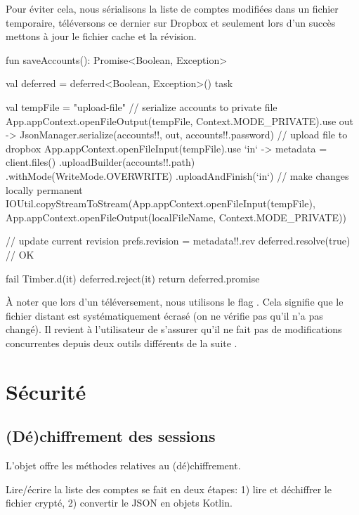 Pour éviter cela, nous sérialisons la liste de comptes modifiées dans un fichier temporaire, téléversons ce dernier sur Dropbox et seulement lors d'un succès mettons à jour le fichier cache et la révision.

\begin{kotlincode}
fun saveAccounts(): Promise<Boolean, Exception> {
    val deferred = deferred<Boolean, Exception>()
    task {
        val tempFile = "upload-file"
        // serialize accounts to private file
        App.appContext.openFileOutput(tempFile, Context.MODE_PRIVATE).use { out ->
            JsonManager.serialize(accounts!!, out, accounts!!.password)
        }
        // upload file to dropbox
        App.appContext.openFileInput(tempFile).use { `in` ->
            metadata = client.files()
                    .uploadBuilder(accounts!!.path)
                    .withMode(WriteMode.OVERWRITE)
                    .uploadAndFinish(`in`)
        }
        // make changes locally permanent
        IOUtil.copyStreamToStream(App.appContext.openFileInput(tempFile),
                App.appContext.openFileOutput(localFileName, Context.MODE_PRIVATE))

        // update current revision
        prefs.revision = metadata!!.rev
        deferred.resolve(true) // OK
    } fail {
        Timber.d(it)
        deferred.reject(it)
    }
    return deferred.promise
}
\end{kotlincode}

À noter que lors d'un téléversement, nous utilisons le flag . Cela signifie que le fichier distant est systématiquement écrasé (on ne vérifie pas qu'il n'a pas changé). Il revient à l'utilisateur de s'assurer qu'il ne fait pas de modifications concurrentes depuis deux outils différents de la suite \easypass.

\section{Sécurité}

\subsection{(Dé)chiffrement des sessions}

L'objet  offre les méthodes relatives au (dé)chiffrement.

Lire/écrire la liste des comptes se fait en deux étapes: 1) lire et déchiffrer le fichier crypté, 2) convertir le JSON en objets Kotlin.

